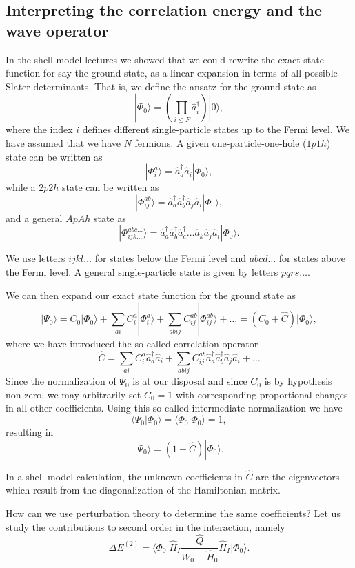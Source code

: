 \subsection{Interpreting the correlation energy and the wave operator}

In the shell-model lectures we showed that we could rewrite the exact state function for say the ground state, as a linear expansion in terms of all possible Slater determinants. That is, we 
define the ansatz for the ground state as 
\[
|\Phi_0\rangle = \left(\prod_{i\le F}\hat{a}_{i}^{\dagger}\right)|0\rangle,
\]
where the index $i$ defines different single-particle states up to the Fermi level. We have assumed that we have $N$ fermions. 
A given one-particle-one-hole ($1p1h$) state can be written as
\[
|\Phi_i^a\rangle = \hat{a}_{a}^{\dagger}\hat{a}_i|\Phi_0\rangle,
\]
while a $2p2h$ state can be written as
\[
|\Phi_{ij}^{ab}\rangle = \hat{a}_{a}^{\dagger}\hat{a}_{b}^{\dagger}\hat{a}_j\hat{a}_i|\Phi_0\rangle,
\]
and a general $ApAh$ state as 
\[
|\Phi_{ijk\dots}^{abc\dots}\rangle = \hat{a}_{a}^{\dagger}\hat{a}_{b}^{\dagger}\hat{a}_{c}^{\dagger}\dots\hat{a}_k\hat{a}_j\hat{a}_i|\Phi_0\rangle.
\]

We use letters $ijkl\dots$ for states below the Fermi level and $abcd\dots$ for states above the Fermi level. A general single-particle state is given by letters $pqrs\dots$.

We can then expand our exact state function for the ground state 
as
\[
|\Psi_0\rangle=C_0|\Phi_0\rangle+\sum_{ai}C_i^a|\Phi_i^a\rangle+\sum_{abij}C_{ij}^{ab}|\Phi_{ij}^{ab}\rangle+\dots
=(C_0+\hat{C})|\Phi_0\rangle,
\]
where we have introduced the so-called correlation operator 
\[
\hat{C}=\sum_{ai}C_i^a\hat{a}_{a}^{\dagger}\hat{a}_i  +\sum_{abij}C_{ij}^{ab}\hat{a}_{a}^{\dagger}\hat{a}_{b}^{\dagger}\hat{a}_j\hat{a}_i+\dots
\]
Since the normalization of $\Psi_0$ is at our disposal and since $C_0$ is by hypothesis non-zero, we may arbitrarily set $C_0=1$ with 
corresponding proportional changes in all other coefficients. Using this so-called intermediate normalization we have
\[
\langle \Psi_0 | \Phi_0 \rangle = \langle \Phi_0 | \Phi_0 \rangle = 1, 
\]
resulting in 
\[
|\Psi_0\rangle=(1+\hat{C})|\Phi_0\rangle.
\]

In a shell-model calculation, the unknown coefficients in $\hat{C}$ are the 
eigenvectors which result from the diagonalization of the Hamiltonian matrix.

How can we use perturbation theory to determine the same coefficients? Let us study the contributions to second order in the interaction, namely
\[
\Delta E^{(2)}=\langle\Phi_0\vert \hat{H}_I\frac{\hat{Q}}{W_0-\hat{H}_0}\hat{H}_I\vert \Phi_0\rangle.
\]

